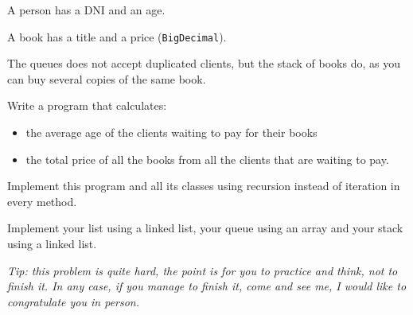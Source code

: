 \documentclass[a4paper, 11pt]{article}
\begin{document}
A person has a DNI and an age.

A book has a title and a price (\texttt{BigDecimal}).

The queues does not accept duplicated clients, but the stack of books do, as
you can buy several copies of the same book.

Write a program that calculates:

\begin{itemize}

  \item the average age of the clients waiting to pay for their books

  \item the total price of all the books from all the clients that are waiting to pay.

\end{itemize}

Implement this program and all its classes using recursion instead of iteration
in every method.

Implement your list using a linked list, your queue using an array and your
stack using a linked list.

\textsl{Tip: this problem is quite hard, the point is for you to practice and
think, not to finish it. In any case, if you manage to finish it, come and see
me, I would like to congratulate you in person.}
\end{document}
